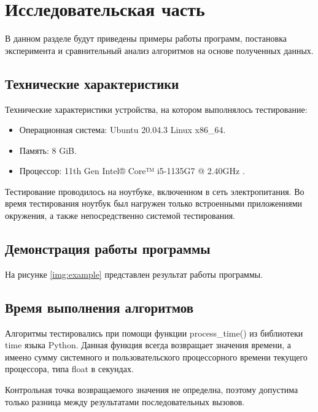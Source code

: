 \chapter{Исследовательская часть}

В данном разделе будут приведены примеры работы программ, постановка эксперимента и сравнительный анализ алгоритмов на основе полученных данных.

\section{Технические характеристики}

Технические характеристики устройства, на котором выполнялось тестирование:

\begin{itemize}
	\item Операционная система: Ubuntu 20.04.3 \cite{ubuntu} Linux \cite{linux} x86\_64.
	\item Память: 8 GiB.
	\item Процессор: 11th Gen Intel® Core™ i5-1135G7 @ 2.40GHz \cite{intel}.
\end{itemize}

Тестирование проводилось на ноутбуке, включенном в сеть электропитания. Во время тестирования ноутбук был нагружен только встроенными приложениями окружения, а также непосредственно системой тестирования.

\section{Демонстрация работы программы}

На рисунке \ref{img:example} представлен результат работы программы.


\section{Время выполнения алгоритмов}

Алгоритмы тестировались при помощи функции process\_time() из библиотеки time языка Python. Данная функция всегда возвращает значения времени, а имеено сумму системного и пользовательского процессорного времени текущего процессора, типа float в секундах.

Контрольная точка возвращаемого значения не определна, поэтому допустима только разница между результатами последовательных вызовов.

